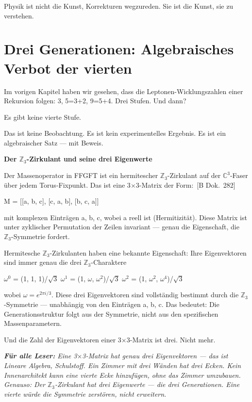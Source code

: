 \documentclass[11pt,oneside]{book}
\newcommand{\status}[1]{\penalty10000\,{\scriptsize\textcolor{gray!60}{[#1]}}}
\newenvironment{laierspur}{%
  \par\vspace{4pt}%
  \noindent\small\itshape\color{blue!60!black}%
  \textbf{Für alle Leser:}\enspace\ignorespaces}{%
  \par\vspace{4pt}\normalsize\normalfont\normalcolor}
\begin{document}
Physik ist nicht die Kunst, Korrekturen wegzureden. Sie ist die Kunst,
sie zu verstehen.








\chapter{Drei Generationen: Algebraisches Verbot der vierten}

Im vorigen Kapitel haben wir gesehen, dass die Leptonen-Wicklungszahlen
einer Rekursion folgen: 3, 5=3+2, 9=5+4. Drei Stufen. Und dann?


Es gibt keine vierte Stufe.


Das ist keine Beobachtung. Es ist kein experimentelles Ergebnis. Es ist
ein algebraischer Satz — mit Beweis.


\textbf{Der $\mathbb{Z}_3$-Zirkulant und seine drei Eigenwerte}


Der Massenoperator in FFGFT ist ein hermitescher $\mathbb{Z}_3$-Zirkulant auf der
$\mathbb{C}^3$-Faser über jedem Torus-Fixpunkt. Das ist eine 3$\times$3-Matrix der Form: \status{B Dok.~282}


M = [[a, b, c],
     [c, a, b],
     [b, c, a]]


mit komplexen Einträgen a, b, c, wobei a reell ist (Hermitizität). Diese
Matrix ist unter zyklischer Permutation der Zeilen invariant — genau die
Eigenschaft, die $\mathbb{Z}_3$-Symmetrie fordert.


Hermitesche $\mathbb{Z}_3$-Zirkulanten haben eine bekannte Eigenschaft: Ihre
Eigenvektoren sind immer genau die drei $\mathbb{Z}_3$-Charaktere


$\omega^0$ = (1, 1, 1)/$\sqrt{3}$
$\omega^1$ = (1, $\omega$, $\omega^2$)/$\sqrt{3}$
$\omega^2$ = (1, $\omega^2$, $\omega^4$)/$\sqrt{3}$


wobei $\omega = e^{2\pi i/3}$. Diese drei Eigenvektoren sind vollständig bestimmt
durch die $\mathbb{Z}_3$-Symmetrie — unabhängig von den Einträgen a, b, c. Das
bedeutet: Die Generationsstruktur folgt aus der Symmetrie, nicht aus
den spezifischen Massenparametern.


Und die Zahl der Eigenvektoren einer 3$\times$3-Matrix ist drei. Nicht mehr.


\begin{laierspur}
Eine 3$\times$3-Matrix hat genau drei Eigenvektoren — das ist
Lineare Algebra, Schulstoff. Ein Zimmer mit drei Wänden hat drei Ecken.
Kein Innenarchitekt kann eine vierte Ecke hinzufügen, ohne das Zimmer
umzubauen. Genauso: Der $\mathbb{Z}_3$-Zirkulant hat drei Eigenwerte — die drei
Generationen. Eine vierte würde die Symmetrie zerstören, nicht erweitern.
\end{laierspur}
\end{document}
